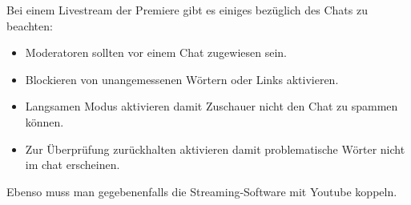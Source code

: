 
Bei einem Livestream der Premiere gibt es einiges bezüglich des Chats zu beachten:
\begin{itemize}
  \item Moderatoren sollten vor einem Chat zugewiesen sein.
  \item Blockieren von unangemessenen Wörtern oder Links aktivieren.
  \item Langsamen Modus aktivieren damit Zuschauer nicht den Chat zu spammen können.
  \item \grqq{}Zur Überprüfung zurückhalten\grqq{} aktivieren damit problematische Wörter nicht im chat erscheinen.
\end{itemize}

Ebenso muss man gegebenenfalls die Streaming-Software mit Youtube koppeln.

